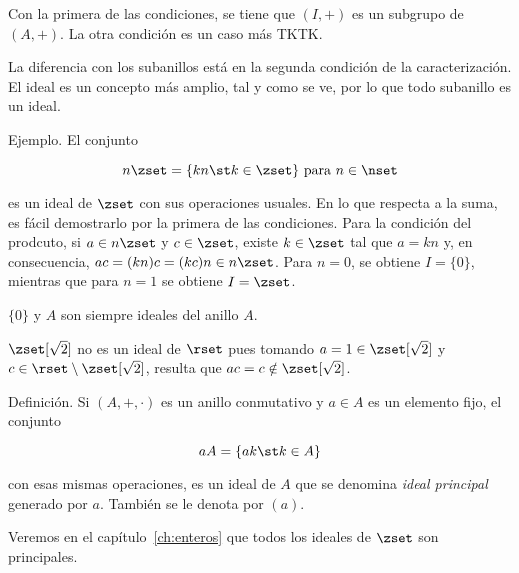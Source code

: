 Con la primera de las condiciones, se tiene que $(I, +)$ es un subgrupo de
$(A, +)$. La otra condición es un caso más TKTK.

La diferencia con los subanillos está en la segunda condición de la
caracterización. El ideal es un concepto más amplio, tal y como se ve, por
lo que todo subanillo es un ideal.

Ejemplo. El conjunto

$$ n\zset = \{kn \st k \in \zset\} \ \text{para} \ n \in \nset $$

\noindent es un ideal de $\zset$ con sus operaciones usuales. En lo que
respecta a la suma, es fácil demostrarlo por la primera de las condiciones.
Para la condición del prodcuto, si $a \in n\zset$ y $c \in \zset$, existe $k
\in \zset$ tal que $a = kn$ y, en consecuencia, $ac = (kn)c = (kc)n \in
n\zset$. Para $n = 0$, se obtiene $I = \{0\}$, mientras que para $n = 1$ se
obtiene $I = \zset$.

$\{0\}$ y $A$ son siempre ideales del anillo $A$.

$\zset[\sqrt{2}]$ no es un ideal de $\rset$ pues tomando $a = 1 \in
\zset[\sqrt{2}]$ y $c \in \rset \setminus \zset[\sqrt{2}]$, resulta que $ac
= c \notin \zset[\sqrt{2}]$.

Definición. Si $(A, +, \cdot)$ es un anillo conmutativo y $a \in A$ es un
elemento fijo, el conjunto

$$ aA = \{ak \st k \in A\} $$

\noindent con esas mismas operaciones, es un ideal de $A$ que se denomina
\emph{ideal principal} generado por $a$. También se le denota por $(a)$.

Veremos en el capítulo~\ref{ch:enteros} que todos los ideales de $\zset$ son
principales.



























